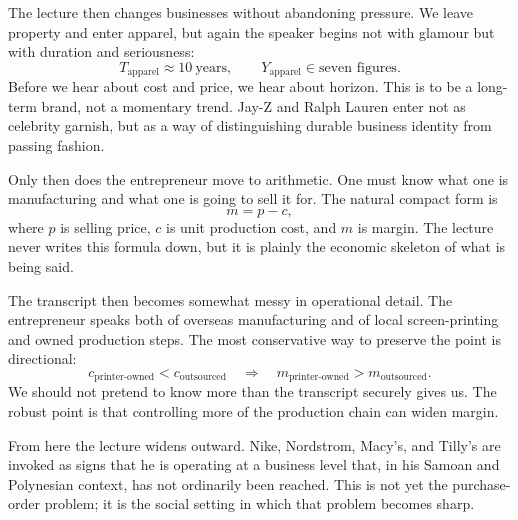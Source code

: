 The lecture then changes businesses without abandoning pressure. We leave property and enter apparel, but again the speaker begins not with glamour but with duration and seriousness:
\begin{equation}
T_{\text{apparel}} \approx 10\ \text{years},\qquad
Y_{\text{apparel}} \in \text{seven figures}.
\end{equation}
Before we hear about cost and price, we hear about horizon. This is to be a long-term brand, not a momentary trend. Jay-Z and Ralph Lauren enter not as celebrity garnish, but as a way of distinguishing durable business identity from passing fashion.

Only then does the entrepreneur move to arithmetic. One must know what one is manufacturing and what one is going to sell it for. The natural compact form is
\begin{equation}
m = p - c,
\end{equation}
where \(p\) is selling price, \(c\) is unit production cost, and \(m\) is margin. The lecture never writes this formula down, but it is plainly the economic skeleton of what is being said.

The transcript then becomes somewhat messy in operational detail. The entrepreneur speaks both of overseas manufacturing and of local screen-printing and owned production steps. The most conservative way to preserve the point is directional:
\begin{equation}
c_{\text{printer-owned}} < c_{\text{outsourced}}
\quad \Rightarrow \quad
m_{\text{printer-owned}} > m_{\text{outsourced}}.
\end{equation}
We should not pretend to know more than the transcript securely gives us. The robust point is that controlling more of the production chain can widen margin.

From here the lecture widens outward. Nike, Nordstrom, Macy's, and Tilly's are invoked as signs that he is operating at a business level that, in his Samoan and Polynesian context, has not ordinarily been reached. This is not yet the purchase-order problem; it is the social setting in which that problem becomes sharp.


